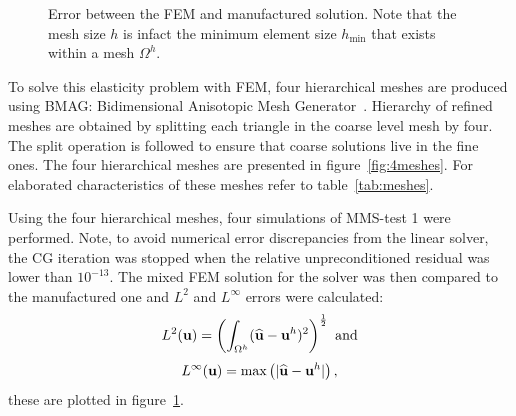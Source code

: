 \begin{figure}[h]
\centering
{}
\caption{Error between the FEM and manufactured solution. Note that the mesh size $h$ is infact the minimum element size $h_{\min}$ that exists within a mesh $\Omega^{h}$.}\label{fig:error}
\end{figure}

To solve this elasticity problem with FEM, four hierarchical meshes are produced using BMAG: Bidimensional Anisotopic Mesh Generator~\cite{hecht1998bamg}. Hierarchy of refined meshes are obtained by splitting each triangle in the coarse level mesh by four. The split operation is followed to ensure that coarse solutions live in the fine ones. The four hierarchical meshes are presented in figure~\ref{fig:4meshes}. For elaborated characteristics of these meshes refer to table~\ref{tab:meshes}.   

Using the four hierarchical meshes, four simulations of MMS-test 1 were performed. Note, to avoid numerical error discrepancies from the linear solver, the CG iteration was stopped when the relative unpreconditioned residual was lower than $10^{-13}$. The mixed FEM solution for the solver was then compared to the manufactured one and $L^2$ and $L^\infty$ errors were calculated:
\begin{equation}
L^2({\textbf{u}})=\left( \int_{\Omega^h} (\widehat{\textbf{u}}-{\textbf{u}}^h)^2\right)^{\frac{1}{2}}\text{ and}
\end{equation}
\begin{equation}
L^\infty({\textbf{u}})=\text{max}\left( |\widehat{\textbf{u}}-{\textbf{u}}^h|\right),
\end{equation}
 these are plotted in figure~\ref{fig:error}.  
 
